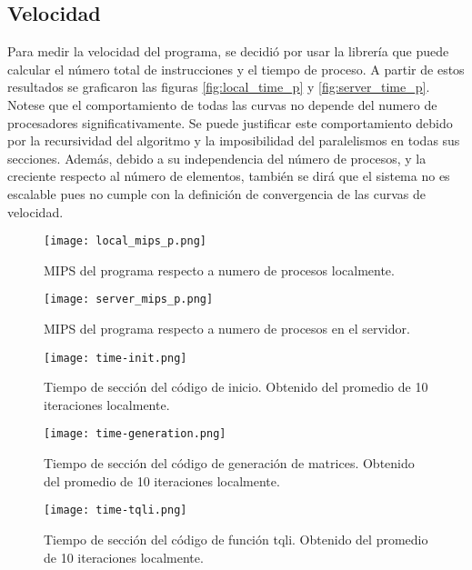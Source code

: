 \subsection{Velocidad}
Para medir la velocidad del programa, se decidió por usar la librería  que puede calcular el número total de instrucciones y el tiempo de proceso. A partir de estos resultados se graficaron las figuras \ref{fig:local_time_p} y \ref{fig:server_time_p}. Notese que el comportamiento de todas las curvas no depende del numero de procesadores significativamente. Se puede justificar este comportamiento debido por la recursividad del algoritmo y la imposibilidad del paralelismos en todas sus secciones. Además, debido a su independencia del número de procesos, y la creciente respecto al número de elementos, también se dirá que el sistema no es escalable pues no cumple con la definición de convergencia de las curvas de velocidad.





\begin{figure}
	\centering
	\texttt{[image: local\_mips\_p.png]}
	\caption{MIPS del programa respecto a numero de procesos localmente.}
	\label{fig:local_mips_p}
\end{figure}



\begin{figure}
	\centering
	\texttt{[image: server\_mips\_p.png]}
	\caption{MIPS del programa respecto a numero de procesos en el servidor.}
	\label{fig:server_mips_p}
\end{figure}

\begin{figure}
	\centering
	\texttt{[image: time-init.png]}
	\caption{Tiempo de sección del código de inicio. Obtenido del promedio de 10 iteraciones localmente.}
	\label{fig:time-init}
\end{figure}

\begin{figure}
	\centering
	\texttt{[image: time-generation.png]}
	\caption{Tiempo de sección del código de generación de matrices. Obtenido del promedio de 10 iteraciones localmente.}
	\label{fig:time-generation}
\end{figure}

\begin{figure}
	\centering
	\texttt{[image: time-tqli.png]}
	\caption{Tiempo de sección del código de función tqli. Obtenido del promedio de 10 iteraciones localmente.}
	\label{fig:time-tqli}
\end{figure}

